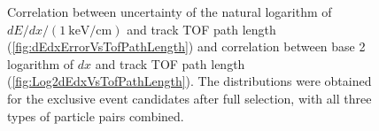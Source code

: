 \begin{figure}%
\centering
\parbox{0.4725\textwidth}{
  \centering
  \begin{subfigure}[b]{\linewidth}{
                }
  \end{subfigure}
}
\quad
\parbox{0.4725\textwidth}{
  \centering
  \begin{subfigure}[b]{\linewidth}{
                }
  \end{subfigure}
}%
\caption[$dE/dx$ error vs. TOF path length and $\log_{2}(dx)$ vs. TOF path length for exclusive event candidates.]{Correlation between uncertainty of the natural logarithm of $dE/dx / (1~\text{keV/cm})$ and track TOF path length (\ref{fig:dEdxErrorVsTofPathLength}) and correlation between base 2 logarithm of $dx$ and track TOF path length (\ref{fig:Log2dEdxVsTofPathLength}). The distributions were obtained for the exclusive event candidates after full selection, with all three types of particle pairs combined.} \label{fig:correlationsTofPathLength}
\end{figure} 


